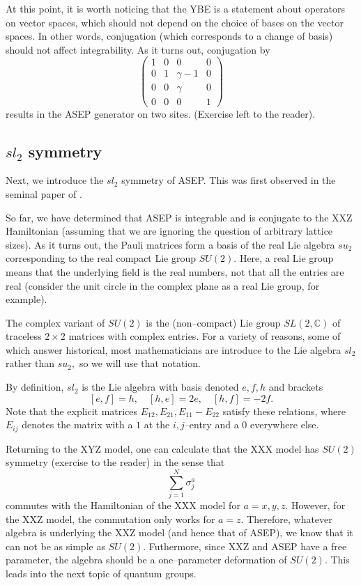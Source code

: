 \documentclass{ximera}
\begin{document}
At this point, it is worth noticing that the YBE is a statement about operators on vector spaces, 
which should not depend on the choice of bases on the vector spaces. In other words, conjugation 
(which corresponds to a change of basis) should not affect integrability. As it turns out, conjugation by 
\[
\left( \begin{array}{cccc}
1 & 0 & 0 & 0 \\
0 & 1 & \gamma-1 & 0 \\
0 & 0 & \gamma & 0 \\
0 & 0 & 0 & 1
\end{array} \right)
\]
results in the ASEP generator on two sites. (Exercise left to the reader).



\subsection{\(sl_2\) symmetry}
Next, we introduce the \(sl_2\) symmetry of ASEP. This was first observed in the seminal paper of \cite{Sch97}. 

So far, we have determined that ASEP is integrable and is conjugate to the XXZ Hamiltonian
(assuming that we are ignoring the question of arbitrary lattice sizes). As it turns out, the
Pauli matrices form a basis of the real Lie algebra \(su_2\) corresponding to the real compact Lie group 
\(SU(2).\) Here, a real Lie group means that the underlying field is the real numbers, not that
all the entries are real (consider the unit circle in the complex plane as a real Lie group, for example).

The complex variant of \(SU(2)\) is the (non--compact) Lie group \(SL(2,\mathbb{C})\) of traceless 
\(2 \times 2\) matrices with complex entries. For a variety of reasons, some of which answer historical,
most mathematicians are introduce to the Lie algebra \(sl_2\) rather than \(su_2,\) so we will use that notation.

By definition, \(sl_2\) is the Lie algebra with basis denoted \(e,f,h\) and brackets
\[
[e,f]=h, \quad [h,e]=2e, \quad [h,f]=-2f.
\]
Note that the explicit matrices \(E_{12},E_{21},E_{11}-E_{22}\) satisfy these relations, where
\(E_{ij}\) denotes the matrix with a \(1\) at the \(i,j\)--entry and a 0 everywhere else. 

Returning to the XYZ model, one can calculate that the XXX model has \(SU(2)\) symmetry (exercise to the
reader) in the sense that
\[
\sum_{j=1}^N \sigma^a_j
\]
commutes with the Hamiltonian of the XXX model for \(a=x,y,z.\) However, for the XXZ model, the
commutation only works for \(a=z.\) Therefore, whatever algebra is underlying the XXZ model (and hence
that of ASEP), we know that it can not be as simple as \(SU(2).\) Futhermore, since XXZ and ASEP have
a free parameter, the algebra should be a one--parameter deformation of \(SU(2).\) This leads into
the next topic of quantum groups. 
\end{document}
